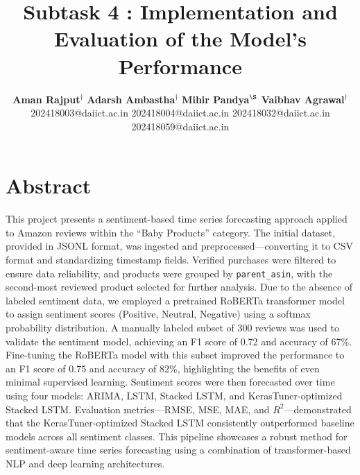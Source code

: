 \documentclass[letterpaper]{article}
\begin{document}
%
\title{\textbf{Subtask 4 : Implementation and Evaluation of the Model's Performance}}
\author{
    \textbf{Aman Rajput}$^{\dagger}$ \hspace{2em} 
    \textbf{Adarsh Ambastha}$^{\dagger}$ \hspace{2em} 
    \textbf{Mihir Pandya}$^{\S}$ \hspace{2em} 
    \textbf{Vaibhav Agrawal}$^{\dagger}$ \\  
    {\small 202418003@daiict.ac.in \hspace{3em} 202418004@daiict.ac.in \hspace{3em} 202418032@daiict.ac.in \hspace{3em} 202418059@daiict.ac.in}
}

\maketitle

\section{Abstract}
This project presents a sentiment-based time series forecasting approach applied to Amazon reviews within the ``Baby Products'' category. The initial dataset, provided in JSONL format, was ingested and preprocessed—converting it to CSV format and standardizing timestamp fields. Verified purchases were filtered to ensure data reliability, and products were grouped by \texttt{parent\_asin}, with the second-most reviewed product selected for further analysis. Due to the absence of labeled sentiment data, we employed a pretrained RoBERTa transformer model to assign sentiment scores (Positive, Neutral, Negative) using a softmax probability distribution. A manually labeled subset of 300 reviews was used to validate the sentiment model, achieving an F1 score of 0.72 and accuracy of 67\%. Fine-tuning the RoBERTa model with this subset improved the performance to an F1 score of 0.75 and accuracy of 82\%, highlighting the benefits of even minimal supervised learning. Sentiment scores were then forecasted over time using four models: ARIMA, LSTM, Stacked LSTM, and KerasTuner-optimized Stacked LSTM. Evaluation metrics—RMSE, MSE, MAE, and $R^2$—demonstrated that the KerasTuner-optimized Stacked LSTM consistently outperformed baseline models across all sentiment classes. This pipeline showcases a robust method for sentiment-aware time series forecasting using a combination of transformer-based NLP and deep learning architectures.
\end{document}
